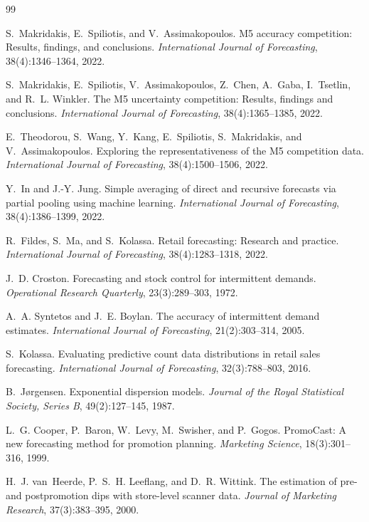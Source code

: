 \begin{thebibliography}{99}\raggedright
\footnotesize
\setlength{\itemsep}{1.5pt}\setlength{\parskip}{0pt}

 S.~Makridakis, E.~Spiliotis, and V.~Assimakopoulos. M5 accuracy competition: Results, findings, and conclusions. \emph{International Journal of Forecasting}, 38(4):1346--1364, 2022.

 S.~Makridakis, E.~Spiliotis, V.~Assimakopoulos, Z.~Chen, A.~Gaba, I.~Tsetlin, and R.~L. Winkler. The M5 uncertainty competition: Results, findings and conclusions. \emph{International Journal of Forecasting}, 38(4):1365--1385, 2022.

 E.~Theodorou, S.~Wang, Y.~Kang, E.~Spiliotis, S.~Makridakis, and V.~Assimakopoulos. Exploring the representativeness of the M5 competition data. \emph{International Journal of Forecasting}, 38(4):1500--1506, 2022.

 Y.~In and J.-Y. Jung. Simple averaging of direct and recursive forecasts via partial pooling using machine learning. \emph{International Journal of Forecasting}, 38(4):1386--1399, 2022.

 R.~Fildes, S.~Ma, and S.~Kolassa. Retail forecasting: Research and practice. \emph{International Journal of Forecasting}, 38(4):1283--1318, 2022.

 J.~D. Croston. Forecasting and stock control for intermittent demands. \emph{Operational Research Quarterly}, 23(3):289--303, 1972.

 A.~A. Syntetos and J.~E. Boylan. The accuracy of intermittent demand estimates. \emph{International Journal of Forecasting}, 21(2):303--314, 2005.

 S.~Kolassa. Evaluating predictive count data distributions in retail sales forecasting. \emph{International Journal of Forecasting}, 32(3):788--803, 2016.

 B.~J{\o}rgensen. Exponential dispersion models. \emph{Journal of the Royal Statistical Society, Series B}, 49(2):127--145, 1987.

 L.~G. Cooper, P.~Baron, W.~Levy, M.~Swisher, and P.~Gogos. PromoCast: A new forecasting method for promotion planning. \emph{Marketing Science}, 18(3):301--316, 1999.

 H.~J. van~Heerde, P.~S.~H. Leeflang, and D.~R. Wittink. The estimation of pre- and postpromotion dips with store-level scanner data. \emph{Journal of Marketing Research}, 37(3):383--395, 2000.


\end{thebibliography}
